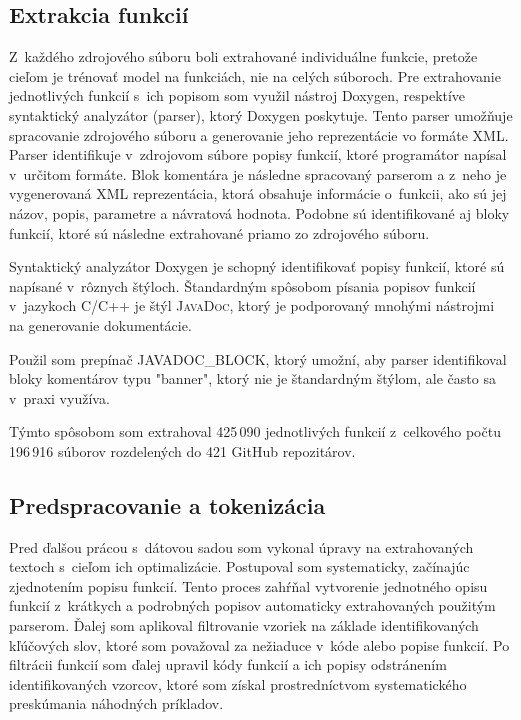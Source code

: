 \subsection*{Extrakcia funkcií}

Z~každého zdrojového súboru boli extrahované individuálne funkcie, pretože cieľom je trénovať model na funkciách, nie na celých súboroch. Pre extrahovanie jednotlivých funkcií s~ich popisom som využil nástroj Doxygen, respektíve syntaktický analyzátor (parser), ktorý Doxygen poskytuje. Tento parser umožňuje spracovanie zdrojového súboru a generovanie jeho reprezentácie vo formáte \textsc{XML}. Parser identifikuje v~zdrojovom súbore popisy funkcií, ktoré programátor napísal v~určitom formáte. Blok komentára je následne spracovaný parserom a z~neho je vygenerovaná \textsc{XML} reprezentácia, ktorá obsahuje informácie o~funkcii, ako sú jej názov, popis, parametre a návratová hodnota. Podobne sú identifikované aj bloky funkcií, ktoré sú následne extrahované priamo zo zdrojového súboru.
    
Syntaktický analyzátor Doxygen je schopný identifikovať popisy funkcií, ktoré sú napísané v~rôznych štýloch. Štandardným spôsobom písania popisov funkcií v~jazykoch C/C++ je štýl \textsc{JavaDoc}, ktorý je podporovaný mnohými nástrojmi na generovanie dokumentácie.

Použil som prepínač \textsc{JAVADOC\_BLOCK}, ktorý umožní, aby parser identifikoval bloky komentárov typu "banner", ktorý nie je štandardným štýlom, ale často sa v~praxi využíva.

Týmto spôsobom som extrahoval 425\,090 jednotlivých funkcií z~celkového počtu 196\,916 súborov rozdelených do 421 GitHub repozitárov.

\subsection*{Predspracovanie a tokenizácia}

Pred ďalšou prácou s~dátovou sadou som vykonal úpravy na extrahovaných textoch s~cieľom ich optimalizácie. Postupoval som systematicky, začínajúc zjednotením popisu funkcií. Tento proces zahŕňal vytvorenie jednotného opisu funkcií z~krátkych a podrobných popisov automaticky extrahovaných použitým parserom. Ďalej som aplikoval filtrovanie vzoriek na základe identifikovaných kľúčových slov, ktoré som považoval za nežiaduce v~kóde alebo popise funkcií. Po filtrácii funkcií som ďalej upravil kódy funkcií a ich popisy odstránením identifikovaných vzorcov, ktoré som získal prostredníctvom systematického preskúmania náhodných príkladov.

